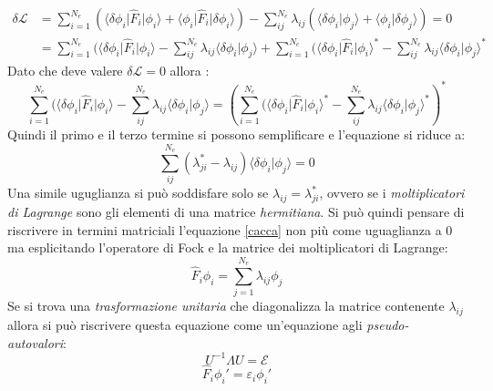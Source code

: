 \documentclass[oneside]{amsbook}
\numberwithin{section}{chapter}
\numberwithin{equation}{section}
\numberwithin{figure}{section}
\begin{document}
\begin{equation}
\label{cacca}
\begin{aligned}
\delta\mathcal{L}&= \sum \limits_{i=1} ^{N_e}( \langle\delta \phi_i\vert \hat{F}_i\vert\phi_i\rangle +\langle\phi_i\vert\hat{F}_i\vert\delta\phi_i\rangle )-\sum \limits _{ij} ^{N_e}\lambda _{ij} (\langle \delta \phi_i\vert\phi_j\rangle+\langle\phi_i\vert\delta\phi_j\rangle)=0\\
&= \sum \limits_{i=1} ^{N_e}( \langle\delta \phi_i\vert \hat{F}_i\vert\phi_i\rangle-\sum \limits _{ij} ^{N_e}\lambda _{ij} \langle \delta \phi_i\vert\phi_j\rangle + \sum \limits_{i=1} ^{N_e}( \langle\delta \phi_i\vert \hat{F}_i\vert\phi_i\rangle^*-\sum \limits _{ij} ^{N_e}\lambda _{ij} \langle \delta \phi_i\vert\phi_j\rangle^*
\end{aligned}
\end{equation}
Dato che deve valere $\delta\mathcal{L}=0$ allora :
\begin{equation}
\sum \limits_{i=1} ^{N_e}( \langle\delta \phi_i\vert \hat{F}_i\vert\phi_i\rangle-\sum \limits _{ij} ^{N_e}\lambda _{ij} \langle \delta \phi_i\vert\phi_j\rangle =\left(  \sum \limits_{i=1} ^{N_e}( \langle\delta \phi_i\vert \hat{F}_i\vert\phi_i\rangle^*-\sum \limits _{ij} ^{N_e}\lambda _{ij} \langle \delta \phi_i\vert\phi_j\rangle^*\right)^*
\end{equation}
Quindi il primo e il terzo termine si possono semplificare e l'equazione si riduce a:
\begin{equation}
\sum \limits _{ij} ^{N_e}(\lambda^*_{ji}-\lambda_{ij})\langle \delta \phi_i\vert\phi_j\rangle = 0
\end{equation}
Una simile uguglianza si può soddisfare solo se $\lambda_{ij}=\lambda^*_{ji}$, ovvero se i \emph{moltiplicatori di Lagrange }sono gli elementi di una matrice \emph{hermitiana}. Si può quindi pensare di riscrivere in termini matriciali l'equazione \ref{cacca} non più come uguaglianza a $0$ ma esplicitando l'operatore di Fock e la matrice dei moltiplicatori di Lagrange:
\begin{equation}
\hat{F}_i \phi_i= \sum \limits_{j=1} ^{N_e}\lambda_{ij} \phi_j
\end{equation}
Se si trova una \emph{trasformazione unitaria} che diagonalizza la matrice contenente $\lambda_{ij}$ allora si può riscrivere questa equazione come un'equazione agli \emph{pseudo-autovalori}:
\begin{equation}
U^{-1} \Lambda U = \mathcal{E}
\end{equation}
\begin{equation}
\hat{F}_i \phi_i'= \varepsilon_i \phi_i'
\end{equation}
\end{document}

